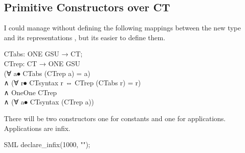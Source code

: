 
\subsection{Primitive Constructors over CT}

I could manage without defining the following mappings between the new type and its representations , but its easier to define them.


\begin{HOLConst}
\+\PrNM{} \PrNL{}CTabs\PrNN{}: ONE GSU → CT;\\
\+\PrNM{} \PrNL{}CTrep\PrNN{}: CT → ONE GSU\\
\PrPH{}\PrPM{}\PrPM{}\PrPM{}\PrPM{}\PrPM{}\PrPM{}\PrPM{}\PrPM{}\PrPM{}\PrPM{}\PrPM{}
\+\PrNM{}	(∀ a⦁ CTabs (CTrep a) = a)\\
\+\PrNM{}     ∧ (∀ r⦁ CTsyntax r ⇔ CTrep (CTabs r) = r)\\
\+\PrNM{}     ∧ OneOne CTrep\\
\+\PrNM{}     ∧ (∀ a⦁ CTsyntax (CTrep a))\\
\end{HOLConst}


There will be two constructors one for constants and one for applications.
Applications are infix.

\begin{GFT}{SML}
\+declare\_infix(1000, "");\\
\end{GFT}

